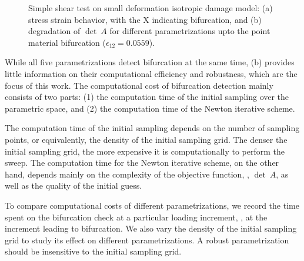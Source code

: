 \documentclass[12pt]{article}
\numberwithin{equation}{section}
\begin{document}
\begin{figure}[htbp]
  \centering {} 
  \caption{Simple shear test on small deformation isotropic damage
    model: (a) stress strain behavior, with the X indicating
    bifurcation, and (b) degradation of $\det~A$ for different
    parametrizations upto the point material bifurcation
    ($\epsilon_{12}=0.0559$).}
  \label{fig:iso_stress_strain}
\end{figure}

While all five parametrizations detect bifurcation at the same time,
(b) provides little information on their
computational efficiency and robustness, which are the focus of this
work. The computational cost of bifurcation detection mainly consists
of two parts: (1) the computation time of the initial sampling over
the parametric space, and (2) the computation time of the Newton
iterative scheme.

The computation time of the initial sampling depends on the number of
sampling points, or equivalently, the density of the initial sampling
grid. The denser the initial sampling grid, the more expensive it is
computationally to perform the sweep. The computation time for the
Newton iterative scheme, on the other hand, depends mainly on the
complexity of the objective function, \ie, $\det~A$, as well as the
quality of the initial guess.

To compare computational costs of different parametrizations, we
record the time spent on the bifurcation check at a particular loading
increment, \eg, at the increment leading to bifurcation. We also vary
the density of the initial sampling grid to study its effect on
different parametrizations. A robust parametrization should be
insensitive to the initial sampling grid.
\end{document}
